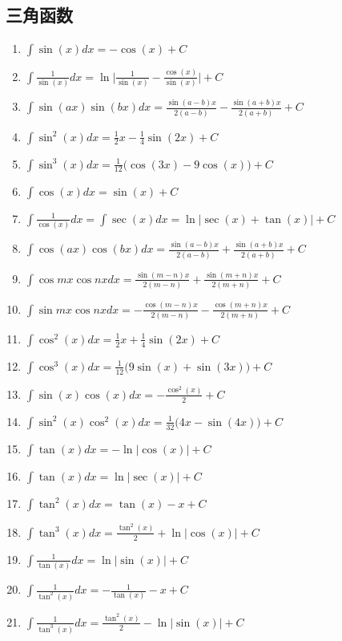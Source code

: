 \documentclass[10pt, a4paper, twocolumn]{article}
\begin{document}
\subsection{三角函数}
\begin{enumerate}
    \item $\int \sin(x) dx = -\cos(x) + C$
    \item $\int \frac{1}{\sin(x)} dx = \ln\Bigg|\frac{1}{\sin(x)} - \frac{\cos(x)}{\sin(x)}\Bigg| + C$
    \item $\int \sin(ax)\sin(bx) dx = \frac{\sin(a-b)x}{2(a-b)} - \frac{\sin(a+b)x}{2(a+b)} + C$
    \item $\int \sin^2(x) dx = \frac{1}{2}x - \frac{1}{4}\sin(2x) + C$
    \item $\int \sin^3(x) dx = \frac{1}{12}\Big(\cos(3x)-9\cos(x)\Big) + C$
    \item $\int \cos(x) dx = \sin(x) + C$
    \item $\int \frac{1}{\cos(x)} dx = \int \sec(x)dx = \ln|\sec(x)+\tan(x)| + C$
    \item $\int \cos(ax)\cos(bx) dx = \frac{\sin(a-b)x}{2(a-b)} + \frac{\sin(a+b)x}{2(a+b)} + C$
     \item $\int \cos mx \cos nx dx = \frac{\sin(m-n)x}{2(m-n)} + \frac{\sin(m+n)x}{2(m+n)} + C$
    \item $\int \sin mx \cos nx dx = -\frac{\cos(m-n)x}{2(m-n)} - \frac{\cos(m+n)x}{2(m+n)} + C$
    \item $\int \cos^2(x) dx = \frac{1}{2}x + \frac{1}{4}\sin(2x) + C$
    \item $\int \cos^3(x) dx = \frac{1}{12}\Big(9\sin(x)+\sin(3x)\Big) + C$
    \item $\int \sin(x)\cos(x) dx = -\frac{\cos^2(x)}{2} + C$
    \item $\int \sin^2(x)\cos^2(x) dx = \frac{1}{32}\Big(4x-\sin(4x)\Big) + C$
    \item $\int \tan(x) dx = -\ln|\cos(x)| + C$
    \item $\int \tan(x) dx = \ln|\sec(x)| + C$
    \item $\int \tan^2(x) dx = \tan(x)-x + C$
    \item $\int \tan^3(x) dx = \frac{\tan^2(x)}{2} + \ln|\cos(x)| + C$
    \item $\int \frac{1}{\tan(x)} dx = \ln|\sin(x)| + C$
    \item $\int \frac{1}{\tan^2(x)} dx = -\frac{1}{\tan(x)}-x + C$
    \item $\int \frac{1}{\tan^3(x)} dx = \frac{\tan^2(x)}{2} - \ln|\sin(x)| + C$
\end{enumerate}
\end{document}
